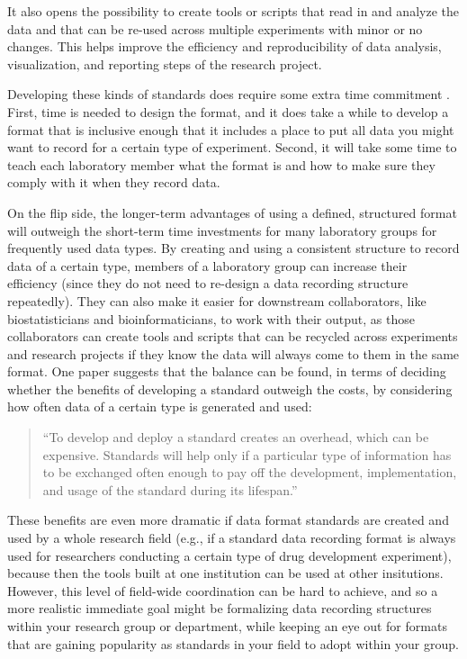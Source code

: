 \documentclass[]{tufte-book}
\begin{document}
It also opens the possibility to create tools or scripts that read in and
analyze the data and that can be re-used across multiple experiments with minor
or no changes. This helps improve the efficiency and reproducibility of data
analysis, visualization, and reporting steps of the research project.

Developing these kinds of standards does require some extra time commitment
\citep{brazma2006standards}. First, time is needed to design the format, and it does
take a while to develop a format that is inclusive enough that it includes a
place to put all data you might want to record for a certain type of experiment.
Second, it will take some time to teach each laboratory member what the format
is and how to make sure they comply with it when they record data.

On the flip side, the longer-term advantages of using a defined, structured
format will outweigh the short-term time investments for many laboratory groups
for frequently used data types. By creating and using a consistent structure to
record data of a certain type, members of a laboratory group can increase their
efficiency (since they do not need to re-design a data recording structure
repeatedly). They can also make it easier for downstream collaborators, like
biostatisticians and bioinformaticians, to work with their output, as those
collaborators can create tools and scripts that can be recycled across
experiments and research projects if they know the data will always come to them
in the same format. One paper suggests that the balance can be found, in terms of deciding whether
the benefits of developing a standard outweigh the costs, by considering how
often data of a certain type is generated and used:

\begin{quote}
``To develop and deploy a standard creates an overhead, which can be expensive.
Standards will help only if a particular type of information has to be
exchanged often enough to pay off the development, implementation, and usage
of the standard during its lifespan.'' \citep{brazma2006standards}
\end{quote}

These benefits are even more dramatic if data format standards
are created and used by a whole research field (e.g., if a standard data
recording format is always used for researchers conducting a certain type of
drug development experiment), because then the tools built at one institution
can be used at other insitutions. However, this level of field-wide coordination
can be hard to achieve, and so a more realistic immediate goal might be
formalizing data recording structures within your research group or department,
while keeping an eye out for formats that are gaining popularity as standards in
your field to adopt within your group.
\end{document}
